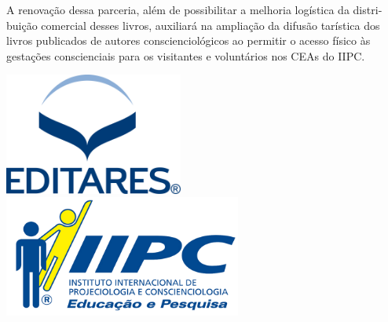 \documentclass{gescons}
\begin{document}
A renovação dessa parceria, além de possibilitar a melhoria logística da distri­buição comercial desses livros, auxiliará na ampliação da difusão tarística dos livros pu­blicados de autores conscienciológicos ao permitir o acesso físico às gestações conscien­ciais para os visitantes e voluntários nos CEAs do IIPC.

\vspace{5mm}

\begin{center}
    \includegraphics[height=4cm]{images/Logo-Editares-com-Marca-Registrada.png}
    \hspace{3cm}
    \includegraphics[height=4cm]{images/IIPC_logo.png} 
\end{center}











\end{document}
